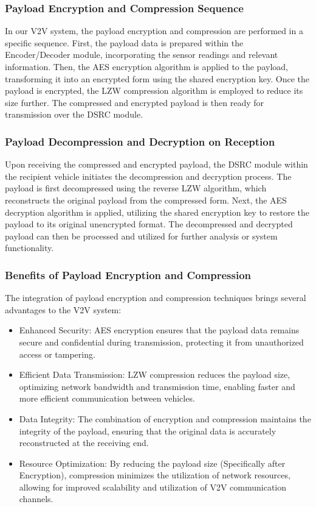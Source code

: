 \documentclass[
12pt,
oneside, 
onehalfspacing, 
nolistspacing, 
parskip, 
chapterinoneline, 
]{AASTCOMPUTER}
\begin{document}
\subsubsection{Payload Encryption and Compression Sequence}
In our V2V system, the payload encryption and compression are performed in a specific sequence. First, the payload data is prepared within the Encoder/Decoder module, incorporating the sensor readings and relevant information. Then, the AES encryption algorithm is applied to the payload, transforming it into an encrypted form using the shared encryption key. Once the payload is encrypted, the LZW compression algorithm is employed to reduce its size further. The compressed and encrypted payload is then ready for transmission over the DSRC module.

\subsubsection{Payload Decompression and Decryption on Reception}
Upon receiving the compressed and encrypted payload, the DSRC module within the recipient vehicle initiates the decompression and decryption process. The payload is first decompressed using the reverse LZW algorithm, which reconstructs the original payload from the compressed form. Next, the AES decryption algorithm is applied, utilizing the shared encryption key to restore the payload to its original unencrypted format. The decompressed and decrypted payload can then be processed and utilized for further analysis or system functionality.

\subsubsection{Benefits of Payload Encryption and Compression}
The integration of payload encryption and compression techniques brings several advantages to the V2V system:
\begin{itemize}
    \item Enhanced Security: AES encryption ensures that the payload data remains secure and confidential during transmission, protecting it from unauthorized access or tampering.
    \item Efficient Data Transmission: LZW compression reduces the payload size, optimizing network bandwidth and transmission time, enabling faster and more efficient communication between vehicles.
    \item Data Integrity: The combination of encryption and compression maintains the integrity of the payload, ensuring that the original data is accurately reconstructed at the receiving end.
    \item Resource Optimization: By reducing the payload size (Specifically after Encryption), compression minimizes the utilization of network resources, allowing for improved scalability and utilization of V2V communication channels.
\end{itemize}
\end{document}

